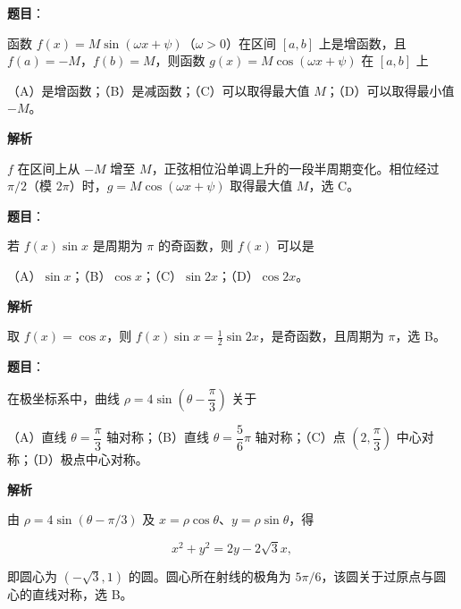 \begin{answer}

\textbf{题目}：

函数 $f(x)=M\sin(\omega x+\psi)$（$\omega>0$）在区间 $[a,b]$ 上是增函数，且 $f(a)=-M$，$f(b)=M$，则函数 $g(x)=M\cos(\omega x+\psi)$ 在 $[a,b]$ 上

（A）是增函数；（B）是减函数；（C）可以取得最大值 $M$；（D）可以取得最小值 $-M$。

\textbf{解析}

$f$ 在区间上从 $-M$ 增至 $M$，正弦相位沿单调上升的一段半周期变化。相位经过 $\pi/2$（模 $2\pi$）时，$g=M\cos(\omega x+\psi)$ 取得最大值 $M$，选 C。


\end{answer}
\begin{answer}

\textbf{题目}：

若 $f(x)\sin x$ 是周期为 $\pi$ 的奇函数，则 $f(x)$ 可以是

（A）$\sin x$；（B）$\cos x$；（C）$\sin 2x$；（D）$\cos 2x$。

\textbf{解析}

取 $f(x)=\cos x$，则 $f(x)\sin x=\frac12\sin2x$，是奇函数，且周期为 $\pi$，选 B。


\end{answer}
\begin{answer}

\textbf{题目}：

在极坐标系中，曲线 $\rho=4\sin\left(\theta-\dfrac\pi3\right)$ 关于

（A）直线 $\theta=\dfrac\pi3$ 轴对称；（B）直线 $\theta=\dfrac56\pi$ 轴对称；（C）点 $\left(2,\dfrac\pi3\right)$ 中心对称；（D）极点中心对称。

\textbf{解析}

由 $\rho=4\sin(\theta-\pi/3)$ 及 $x=\rho\cos\theta$、$y=\rho\sin\theta$，得

\nopagebreak[4]
\[
x^2+y^2=2y-2\sqrt3x,
\]

即圆心为 $(-\sqrt3,1)$ 的圆。圆心所在射线的极角为 $5\pi/6$，该圆关于过原点与圆心的直线对称，选 B。


\end{answer}
